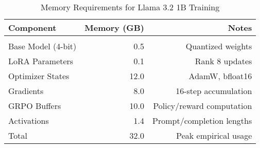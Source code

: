 \begin{table}[H]
  \centering
  \begin{tabular}{lrr}
    \toprule
    Component           & Memory (GB) & Notes \\
    \midrule \\
    Base Model (4-bit)  & 0.5         & Quantized weights \\
    LoRA Parameters     & 0.1         & Rank 8 updates  \\
    Optimizer States    & 12.0        & AdamW, bfloat16 \\
    Gradients           & 8.0         & 16-step accumulation \\
    GRPO Buffers        & 10.0        & Policy/reward computation \\
    Activations         & 1.4         & Prompt/completion lengths \\
    \midrule
    Total               & 32.0        & Peak empirical usage \\
    \bottomrule
  \end{tabular}
  \vspace{0.2cm}
  \caption{Memory Requirements for Llama 3.2 1B Training}
  \label{tab:memory_configs}
\end{table}